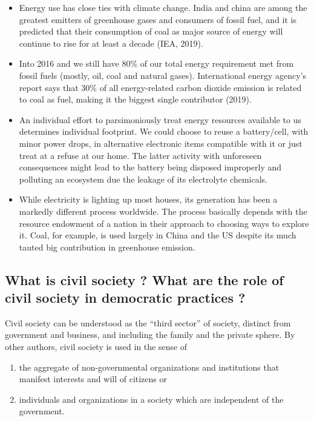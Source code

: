 \documentclass[
  openany]{book}
\providecommand{\tightlist}{%
  \setlength{\itemsep}{0pt}\setlength{\parskip}{0pt}}
\begin{document}
\begin{itemize}
\tightlist
\item
  Energy use has close ties with climate change. India and china are among the greatest emitters of greenhouse gases and consumers of fossil fuel, and it is predicted that their consumption of coal as major source of energy will continue to rise for at least a decade (IEA, 2019).
\item
  Into 2016 and we still have 80\% of our total energy requirement met from fossil fuels (mostly, oil, coal and natural gases). International energy agency's report says that 30\% of all energy-related carbon dioxide emission is related to coal as fuel, making it the biggest single contributor (2019).
\item
  An individual effort to parsimoniously treat energy resources available to us determines individual footprint. We could choose to reuse a battery/cell, with minor power drops, in alternative electronic items compatible with it or just treat at a refuse at our home. The latter activity with unforeseen consequences might lead to the battery being disposed improperly and polluting an ecosystem due the leakage of its electrolyte chemicals.
\item
  While electricity is lighting up most houses, its generation has been a markedly different process worldwide. The process basically depends with the resource endowment of a nation in their approach to choosing ways to explore it. Coal, for example, is used largely in China and the US despite its much tauted big contribution in greenhouse emission.
\end{itemize}

\hypertarget{what-is-civil-society-what-are-the-role-of-civil-society-in-democratic-practices}{%
\subsection{What is civil society ? What are the role of civil society in democratic practices ?}\label{what-is-civil-society-what-are-the-role-of-civil-society-in-democratic-practices}}

Civil society can be understood as the ``third sector'' of society, distinct from government and business, and including the family and the private sphere. By other authors, civil society is used in the sense of

\begin{enumerate}
\def\labelenumi{\arabic{enumi})}
\tightlist
\item
  the aggregate of non-governmental organizations and institutions that manifest interests and will of citizens or
\item
  individuals and organizations in a society which are independent of the government.
\end{enumerate}
\end{document}
